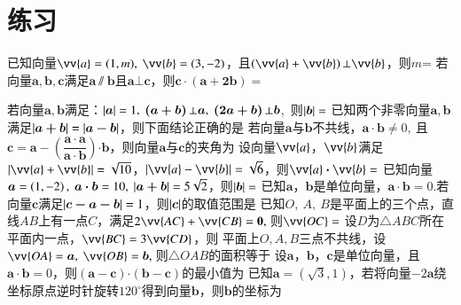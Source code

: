 \documentclass{BHCexam}
\newcommand{\xl}[2]{\vv{#1}\bm\cdot\vv{#2}}
\begin{document}
\section{练习}
\begin{questions}

\qs
已知向量$ \vv{a}=(1,m),~\vv{b}=(3,-2) $，且$\left(\vv{a}+\vv{b}\right)\bot \vv{b} $，则$m$=\xx
{}
\qs 若向量$ \bm{a,b,c} $满足$ \bm{a}\sslash\bm{b} $且$ \bm{a}\bot\bm{c} $，则$ \bm{c\cdot\left(a+2b\right)} =$\xx
{}

\qs 若向量$ \bm{a,b} $满足：$ \left| \bm{a} \right|=1,~\bm{\left(a+b\right)}\bot \bm{a},~\bm{\left(2a+b\right)}\bot \bm{b} $,~则$ \left| \bm{b} \right|= $\xx
{}
\qs 已知两个非零向量$\bm{ a,b}$满足$ \left| \bm{a+b} \right|=\left| \bm{a-b} \right| $，则下面结论正确的是\xx
{}
\qs 若向量$ \bm{a} $与$ \bm{b} $不共线，$ \bm{a}\cdot \bm{b}\ne 0,~ $且$\bm{c}=\bm{a}-\left(\dfrac{\bm{a\cdot a}}{\bm{a\cdot b}}\right)\bm{\cdot b} $，则向量$ \bm{a} $与$ \bm{c} $的夹角为\xx
{}
\qs
设向量$\vv{a}$，$\vv{b}$满足$\left|\vv{a}+\vv{b}\right|=\sqrt{10}$，$\left|\vv{a}-\vv{b}\right|=\sqrt{6}$，则$\xl{a}{b}=$\xx
{}
\qs 已知向量$ \bm{a}=\left(1,-2\right),\ \bm{a\cdot b}=10,\ \abs{\bm{a+b}}=5\sqrt{2} $，则$ \left| \bm{b} \right|= $\xx
{}
\qs 已知$\bm{a}$，$\bm{b}$是单位向量，$\bm{a\cdot b}=0$.若向量$ \bm{c} $满足$ \left| \bm{c-a-b} \right|=1 $，则$ \left| \bm{c} \right| $的取值范围是\xx
{}
\qs 已知$ O,~A,~B $是平面上的三个点，直线$ AB $上有一点$ C $，满足$ 2\vv{AC}+\vv{CB}=\mathbf{0}, ~$则$ \vv{OC}= $\xx
{}
\qs 设$ D $为$\triangle ABC$所在平面内一点，$ \vv{BC}=3\vv{CD} $，则\xx
{}
\qs 平面上$ O,A,B $三点不共线，设$ \vv{OA}=\bm{a},~\vv{OB}=\bm{b},~ $则$ \triangle OAB $的面积等于\xx
{}
\qs 设$\bm{a}$，$\bm{b}$，$\bm{c}$是单位向量，且$ \bm{a\cdot b} =0$，则$ \left(\bm{a-c}\right)\bm{\cdot}\left(\bm{b-c}\right) $的最小值为\xx
{}
\qs 已知$ \bm{a}=(\sqrt{3},1) $，若将向量$ -2\bm{a} $绕坐标原点逆时针旋转$ 120^{\circ} $得到向量$ \bm{b} $，则$ \bm{b} $的坐标为\xx
{}


\end{questions}
\end{document}
